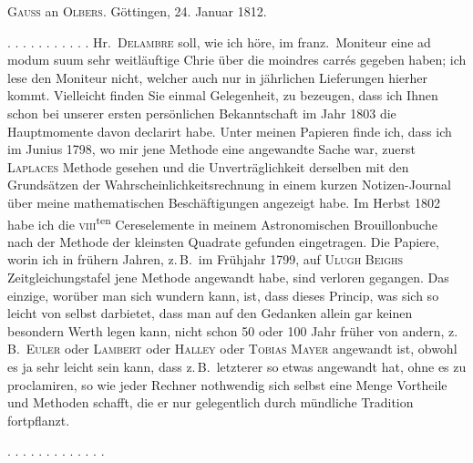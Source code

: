 \clearpage
{}
\begin{center}
\textsc{Gauss} an \textsc{Olbers}. Göttingen, 24. Januar 1812.
\end{center}

\noindent . . . . . . . . . . . Hr.\ \textsc{Delambre} soll, wie ich höre, im franz.\ Moniteur eine ad modum suum sehr weitläuftige Chrie über die moindres carrés gegeben haben; ich lese den Moniteur nicht, welcher auch nur in jährlichen Lieferungen hierher kommt. Vielleicht finden Sie einmal Gelegenheit,  zu bezeugen, dass ich Ihnen schon bei unserer ersten persönlichen Bekanntschaft im Jahr 1803 die Hauptmomente davon declarirt habe. Unter meinen Papieren finde ich, dass ich im Junius 1798, wo mir jene Methode eine  angewandte Sache war, zuerst \textsc{Laplaces} Methode gesehen und die Unverträglichkeit derselben mit den Grundsätzen der Wahrscheinlichkeitsrechnung in einem kurzen Notizen-Journal über meine mathematischen Beschäftigungen angezeigt habe. Im Herbst 1802 habe ich die \textsc{viii}\textsuperscript{ten} Cereselemente in meinem Astronomischen Brouillonbuche nach der Methode der kleinsten Quadrate gefunden eingetragen. Die Papiere, worin ich in frühern Jahren, z.\,B.\ im Frühjahr 1799, auf \textsc{Ulugh Beighs} Zeitgleichungstafel jene Methode angewandt habe, sind verloren gegangen. Das einzige, worüber man sich wundern kann, ist, dass dieses Princip, was sich so leicht von selbst darbietet, dass man auf den Gedanken allein gar keinen besondern Werth legen kann, nicht schon 50 oder 100 Jahr früher von andern, z.\,B.\ \textsc{Euler} oder \textsc{Lambert} oder \textsc{Halley} oder \textsc{Tobias Mayer} angewandt ist, obwohl es ja sehr leicht sein kann, dass z.\,B.\ letzterer so etwas angewandt hat, ohne es zu proclamiren, so wie jeder Rechner nothwendig sich selbst eine Menge Vortheile und Methoden schafft, die er nur gelegentlich durch mündliche Tradition fortpflanzt.

\noindent . . . . . . . . . . . . .

